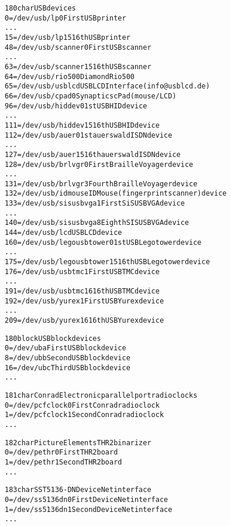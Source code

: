\documentclass[a4paper,8pt,english]{sphinxmanual}
\begin{document}
\begin{alltt}
 180 char       USB devices
                  0 = /dev/usb/lp0      First USB printer
                    ...
                 15 = /dev/usb/lp15     16th USB printer
                 48 = /dev/usb/scanner0 First USB scanner
                    ...
                 63 = /dev/usb/scanner15 16th USB scanner
                 64 = /dev/usb/rio500   Diamond Rio 500
                 65 = /dev/usb/usblcd   USBLCD Interface (info@usblcd.de)
                 66 = /dev/usb/cpad0    Synaptics cPad (mouse/LCD)
                 96 = /dev/usb/hiddev0  1st USB HID device
                    ...
                111 = /dev/usb/hiddev15 16th USB HID device
                112 = /dev/usb/auer0    1st auerswald ISDN device
                    ...
                127 = /dev/usb/auer15   16th auerswald ISDN device
                128 = /dev/usb/brlvgr0  First Braille Voyager device
                    ...
                131 = /dev/usb/brlvgr3  Fourth Braille Voyager device
                132 = /dev/usb/idmouse  ID Mouse (fingerprint scanner) device
                133 = /dev/usb/sisusbvga1       First SiSUSB VGA device
                    ...
                140 = /dev/usb/sisusbvga8       Eighth SISUSB VGA device
                144 = /dev/usb/lcd      USB LCD device
                160 = /dev/usb/legousbtower0    1st USB Legotower device
                    ...
                175 = /dev/usb/legousbtower15   16th USB Legotower device
                176 = /dev/usb/usbtmc1  First USB TMC device
                   ...
                191 = /dev/usb/usbtmc16 16th USB TMC device
                192 = /dev/usb/yurex1   First USB Yurex device
                   ...
                209 = /dev/usb/yurex16  16th USB Yurex device

 180 block      USB block devices
                  0 = /dev/uba          First USB block device
                  8 = /dev/ubb          Second USB block device
                 16 = /dev/ubc          Third USB block device
                    ...

 181 char       Conrad Electronic parallel port radio clocks
                  0 = /dev/pcfclock0    First Conrad radio clock
                  1 = /dev/pcfclock1    Second Conrad radio clock
                    ...

 182 char       Picture Elements THR2 binarizer
                  0 = /dev/pethr0       First THR2 board
                  1 = /dev/pethr1       Second THR2 board
                    ...

 183 char       SST 5136-DN DeviceNet interface
                  0 = /dev/ss5136dn0    First DeviceNet interface
                  1 = /dev/ss5136dn1    Second DeviceNet interface
                    ...


\end{alltt}
\end{document}
